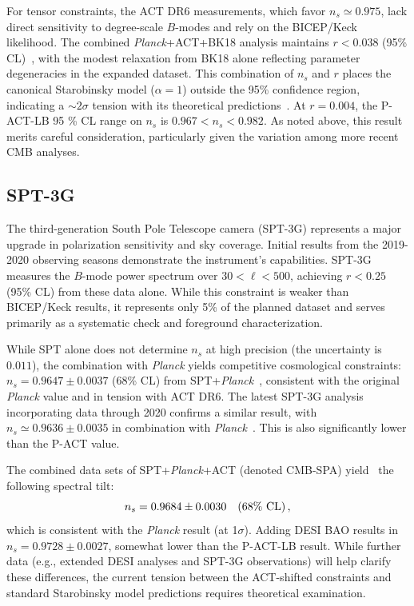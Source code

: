 \documentclass[aps,prev,twocolumn,preprintnumbers,floatfix,nofootinbib]{revtex4-1}
\newcommand{\beq}{\begin{equation}}
\newcommand{\eeq}{\end{equation}}
\begin{document}
For tensor constraints, the ACT DR6 measurements, which favor $n_s \simeq 0.975$, lack direct sensitivity to degree-scale $B$-modes and rely on the BICEP/Keck likelihood. The combined \textit{Planck}+ACT+BK18 analysis maintains $r < 0.038$ (95\% CL)~\cite{ACT:2025fju}, with the modest relaxation from BK18 alone reflecting parameter degeneracies in the expanded dataset. This combination of $n_s$ and $r$ places the canonical Starobinsky model ($\alpha = 1$) outside the 95\% confidence region, indicating a $\sim 2\sigma$ tension with its theoretical predictions~\cite{ACT:2025tim}. 
At $ r=0.004$, the P-ACT-LB 95 \% CL range on $n_s$ is $0.967 < n_s < 0.982$. 
As noted above, this result merits careful consideration, particularly given the variation among more recent CMB analyses. 




\subsection*{SPT-3G}
The third-generation South Pole Telescope camera (SPT-3G) represents a major upgrade in polarization sensitivity and sky coverage. 
Initial results from the 2019-2020 observing seasons demonstrate the instrument's capabilities. SPT-3G measures the $B$-mode power spectrum over $30 < \ell < 500$, achieving $r < 0.25$ (95\% CL) \cite{SPT-3G:2025vtb} from these data alone. While this constraint is weaker than BICEP/Keck results, it represents only 5\% of the planned dataset and serves primarily as a systematic check and foreground characterization.



While SPT alone does not determine $n_s$ at high precision (the uncertainty is $0.011$), 
the combination with \textit{Planck} yields competitive cosmological constraints: $n_s = 0.9647 \pm 0.0037$ (68\% CL) from SPT+\textit{Planck}~\cite{SPT-3G:2024atg}, consistent with the original \textit{Planck} value and in tension with ACT DR6.
The latest SPT-3G analysis incorporating data through 2020 confirms a similar result, with $n_s \simeq 0.9636 \pm 0.0035$ in combination with \textit{Planck}~\cite{SPT-3G:2025bzu}. 
This is also significantly lower than the P-ACT value. 


 The combined data sets of SPT+\textit{Planck}+ACT (denoted CMB-SPA) yield~\cite{SPT-3G:2025bzu} the following spectral tilt:
\beq
n_s = 0.9684 \pm 0.0030 ~~~ (68\%~{\rm CL}) \, ,
\label{nsspa}
\eeq 
which is consistent with the \textit{Planck} result (at 1$\sigma$).
Adding DESI BAO results in $n_s = 0.9728 \pm 0.0027$, somewhat lower than the P-ACT-LB result. 
While further data (e.g., extended DESI analyses and SPT-3G observations) will help clarify these differences, the current tension between the ACT-shifted constraints and standard Starobinsky model predictions requires theoretical examination.
\end{document}
